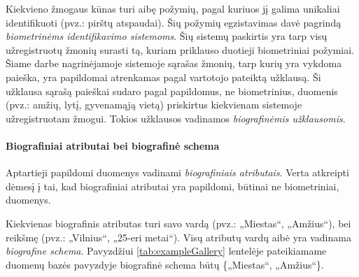 

Kiekvieno žmogaus kūnas turi aibę požymių, pagal kuriuos jį galima unikaliai identifikuoti (pvz.: pirštų atspaudai).
Šių požymių egzistavimas davė pagrindą {\it biometrinėms identifikavimo sistemoms}.
Šių sistemų paskirtis yra tarp visų užregistruotų žmonių surasti tą, kuriam priklauso duotieji biometriniai požymiai.
Šiame darbe nagrinėjamoje sistemoje \cite{NeurotechnologyMegamatcherAccelerator} sąrašas žmonių, tarp kurių yra vykdoma paieška, yra papildomai atrenkamas pagal vartotojo pateiktą užklausą.
Ši užklausa sąrašą paieškai sudaro pagal papildomus, ne biometrinius, duomenis (pvz.: amžių, lytį, gyvenamąją vietą) priskirtus kiekvienam sistemoje užregistruotam žmogui.
Tokios užklausos vadinamos {\it biografinėmis užklausomis}.


\paragraph{Biografiniai atributai bei biografinė schema}

Aptartieji papildomi duomenys vadinami {\it biografiniais atributais}.
Verta atkreipti dėmesį į tai, kad biografiniai atributai yra papildomi, būtinai ne biometriniai, duomenys.

Kiekvienas biografinis atributas turi savo vardą (pvz.: „Miestas“, „Amžius“), bei reikšmę (pvz.: „Vilnius“, „25-eri metai“).
Visų atributų vardų aibė yra vadinama {\it biografine schema}.
Pavyzdžiui \ref{tab:exampleGallery} lentelėje pateikiamame duomenų bazės pavyzdyje biografinė schema būtų \{„Miestas“, „Amžius“\}.

